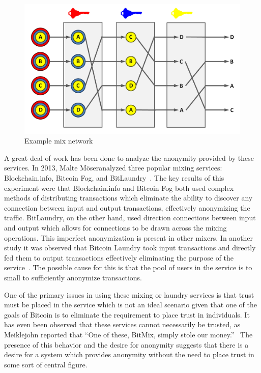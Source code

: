 \documentclass[11pt]{article}
\newcommand{\Moser}{M{\"o}ser}
\begin{document}
\begin{figure}[H] \caption[Example mix network]{Example mix network\protect\footnotemark} \centering
\includegraphics[width=.8\linewidth]{figures/mix.png} \end{figure}


A great deal of work has been done to analyze the anonymity provided by these services.  In 2013, Malte \Moser analyzed
three popular mixing services: Blockchain.info, Bitcoin Fog, and BitLaundry~\cite{moser13}. The key results of this
experiment were that Blockchain.info and Bitcoin Fog both used complex methods of distributing transactions which
eliminate the ability to discover any connection between input and output transactions, effectively anonymizing the
traffic.  BitLaundry, on the other hand, used direction connections between input and output which allows for
connections to be drawn across the mixing operations.  This imperfect anonymization is present in other mixers. In
another study it was observed that Bitcoin Laundry took input transactions and directly fed them to output transactions
effectively eliminating the purpose of the service~\cite{meiklejohn13}. The possible cause for this is that the pool of
users in the service is to small to sufficiently anonymize transactions.

One of the primary issues in using these mixing or laundry services is that trust must be placed in the service which is
not an ideal scenario given that one of the goals of Bitcoin is to eliminate the requirement to place trust in
individuals. It has even been observed that these services cannot necessarily be trusted, as Meiklejohn reported that
``One of these, BitMix, simply stole our money.''~\cite{meiklejohn13} The presence of this behavior and the desire for
anonymity suggests that there is a desire for a system which provides anonymity without the need to place trust in some
sort of central figure.
\end{document}

